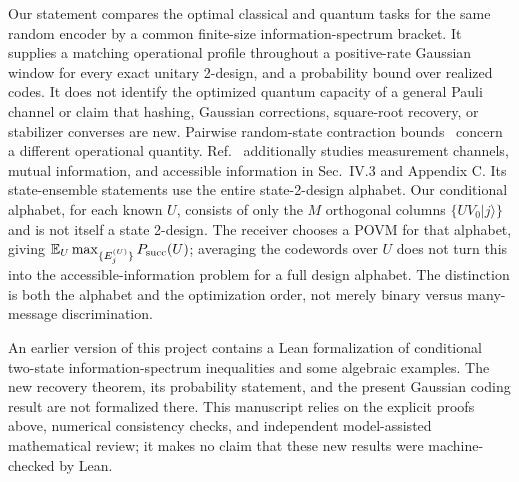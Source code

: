 \documentclass[aps,prl,onecolumn,superscriptaddress,amsmath,amssymb]{revtex4-2}
\newcommand{\E}{\mathbb E}
\begin{document}
Our statement compares the optimal classical and quantum tasks for the same random encoder by a common finite-size information-spectrum bracket. It supplies a matching operational profile throughout a positive-rate Gaussian window for every exact unitary 2-design, and a probability bound over realized codes. It does not identify the optimized quantum capacity of a general Pauli channel or claim that hashing, Gaussian corrections, square-root recovery, or stabilizer converses are new. Pairwise random-state contraction bounds~\cite{Ibarrondo} concern a different operational quantity. Ref.~\cite{Liu} additionally studies measurement channels, mutual information, and accessible information in Sec.~IV.3 and Appendix C. Its state-ensemble statements use the entire state-2-design alphabet. Our conditional alphabet, for each known $U$, consists of only the $M$ orthogonal columns $\{UV_0|j\rangle\}$ and is not itself a state 2-design. The receiver chooses a POVM for that alphabet, giving $\E_U\max_{\{E_j^{(U)}\}}P_{\rm succ}(U)$; averaging the codewords over $U$ does not turn this into the accessible-information problem for a full design alphabet. The distinction is both the alphabet and the optimization order, not merely binary versus many-message discrimination.

An earlier version of this project contains a Lean formalization of conditional two-state information-spectrum inequalities and some algebraic examples. The new recovery theorem, its probability statement, and the present Gaussian coding result are not formalized there. This manuscript relies on the explicit proofs above, numerical consistency checks, and independent model-assisted mathematical review; it makes no claim that these new results were machine-checked by Lean.
\end{document}

